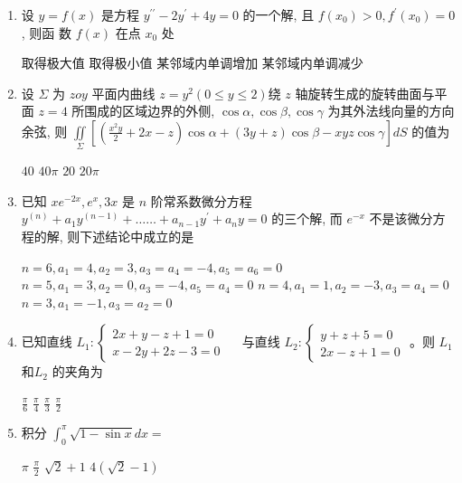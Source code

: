 \begin{enumerate}
\begin{enumerate}
\item 
设 $y=f(x)$ 是方程 $y^{\prime \prime}-2 y^{\prime}+4 y=0$ 的一个解, 且 $f(x_{0})>0, f^{\prime}\left(x_{0}\right)=0$, 则函 数 $f(x)$ 在点 $x_{0}$ 处  
	
\fourchoices
{取得极大值}
{取得极小值}
{某邻域内单调增加}
{某邻域内单调减少}


\item 
设 $ \Sigma $ 为 $z o y$ 平面内曲线 $z=y^{2}(0 \leqslant y \leqslant 2)$绕 $z$ 轴旋转生成的旋转曲面与平 面 $z=4$ 所围成的区域边界的外侧, $\cos \alpha, \cos \beta, \cos \gamma$ 为其外法线向量的方向余弦, 则 $\iint\limits_{\Sigma}\left[\left(\frac{x^{2} y}{2}+2 x-z\right) \cos \alpha+(3 y+z) \cos \beta-x y z \cos \gamma\right] d S$ 的值为  


\fourchoices
{$ 40 $}
{$40 \pi$}
{$ 20 $}
{$20 \pi$}

\item 
已知 $x e^{-2 x}, e^{x}, 3 x$ 是 $n$ 阶常系数微分方程 $y^{(n)}+a_{1} y^{(n-1)}+\ldots \ldots+a_{n-1} y^{\prime}+a_{n} y=0$ 的三个解, 而 $e^{-x}$ 不是该微分方程的解, 则下述结论中成立的是  


\fourchoices
{$n=6, a_{1}=4, a_{2}=3, a_{3}=a_{4}=-4, a_{5}=a_{6}=0$}
{$n=5, a_{1}=3, a_{2}=0, a_{3}=-4, a_{5}=a_{4}=0$}
{$n=4, a_{1}=1, a_{2}=-3, a_{3}=a_{4}=0$}
{$n=3, a_{1}=-1, a_{3}=a_{2}=0$}

\item 
已知直线 $L_{1}:\left\{\begin{array}{l}2 x+y-z+1=0 \\ x-2 y+2 z-3=0\end{array} \quad\right.$ 与直线 $L_{2}:\left\{\begin{array}{l}y+z+5=0 \\ 2 x-z+1=0\end{array}\right.$ 。则 $L_{1}$ 和$L_{2}$ 的夹角为  


\fourchoices
{$\frac{\pi}{6}$}
{$\frac{\pi}{4}$}
{$\frac{\pi}{3}$}
{$\frac{\pi}{2}$}

\item 
积分 $\int_{0}^{\pi} \sqrt{1-\sin x} d x=$  


\fourchoices
{$\pi$}
{$\frac{\pi}{2}$}
{$\sqrt{2}+1$}
{$4(\sqrt{2}-1)$}


	
		
	\end{enumerate}


\end{enumerate}

